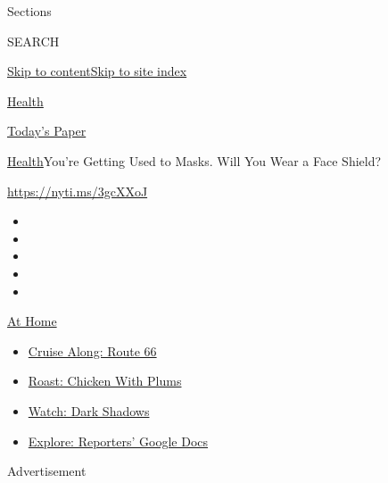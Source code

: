 Sections

SEARCH

\protect\hyperlink{site-content}{Skip to
content}\protect\hyperlink{site-index}{Skip to site index}

\href{https://www.nytimes3xbfgragh.onion/section/health}{Health}

\href{https://myaccount.nytimes3xbfgragh.onion/auth/login?response_type=cookie\&client_id=vi}{}

\href{https://www.nytimes3xbfgragh.onion/section/todayspaper}{Today's
Paper}

\href{/section/health}{Health}\textbar{}You're Getting Used to Masks.
Will You Wear a Face Shield?

\url{https://nyti.ms/3gcXXoJ}

\begin{itemize}
\item
\item
\item
\item
\item
\end{itemize}

\href{https://www.nytimes3xbfgragh.onion/spotlight/at-home?action=click\&pgtype=Article\&state=default\&region=TOP_BANNER\&context=at_home_menu}{At
Home}

\begin{itemize}
\tightlist
\item
  \href{https://www.nytimes3xbfgragh.onion/2020/09/07/travel/route-66.html?action=click\&pgtype=Article\&state=default\&region=TOP_BANNER\&context=at_home_menu}{Cruise
  Along: Route 66}
\item
  \href{https://www.nytimes3xbfgragh.onion/2020/09/04/dining/sheet-pan-chicken.html?action=click\&pgtype=Article\&state=default\&region=TOP_BANNER\&context=at_home_menu}{Roast:
  Chicken With Plums}
\item
  \href{https://www.nytimes3xbfgragh.onion/2020/09/04/arts/television/dark-shadows-stream.html?action=click\&pgtype=Article\&state=default\&region=TOP_BANNER\&context=at_home_menu}{Watch:
  Dark Shadows}
\item
  \href{https://www.nytimes3xbfgragh.onion/interactive/2020/at-home/even-more-reporters-editors-diaries-lists-recommendations.html?action=click\&pgtype=Article\&state=default\&region=TOP_BANNER\&context=at_home_menu}{Explore:
  Reporters' Google Docs}
\end{itemize}

Advertisement

